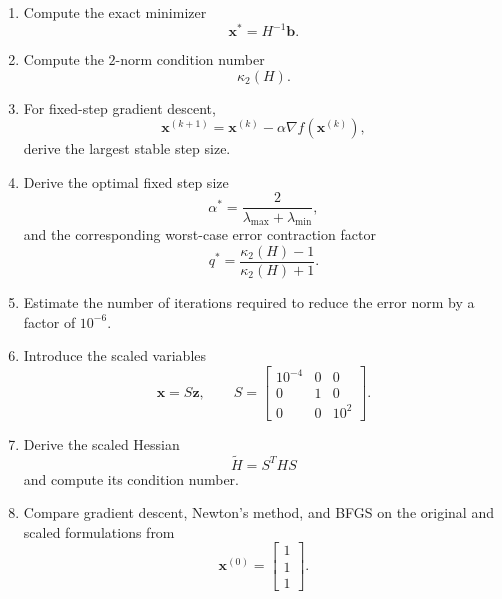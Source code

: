 \begin{enumerate}
    \item Compute the exact minimizer
    \begin{equation}
    \mathbf{x}^*=H^{-1}\mathbf{b}.
    \end{equation}

    \item Compute the $2$-norm condition number
    \begin{equation}
    \kappa_2(H).
    \end{equation}

    \item For fixed-step gradient descent,
    \begin{equation}
    \mathbf{x}^{(k+1)}
    =
    \mathbf{x}^{(k)}
    -
    \alpha
    \nabla f
    \left(
    \mathbf{x}^{(k)}
    \right),
    \end{equation}
    derive the largest stable step size.

    \item Derive the optimal fixed step size
    \begin{equation}
    \alpha^*
    =
    \frac{2}{\lambda_{\max}+\lambda_{\min}},
    \end{equation}
    and the corresponding worst-case error contraction factor
    \begin{equation}
    q^*
    =
    \frac{\kappa_2(H)-1}
    {\kappa_2(H)+1}.
    \end{equation}

    \item Estimate the number of iterations required to reduce the error norm
    by a factor of $10^{-6}$.

    \item Introduce the scaled variables
    \begin{equation}
    \mathbf{x}=S\mathbf{z},
    \qquad
    S=
    \begin{bmatrix}
    10^{-4}&0&0\\
    0&1&0\\
    0&0&10^2
    \end{bmatrix}.
    \end{equation}

    \item Derive the scaled Hessian
    \begin{equation}
    \widetilde{H}=S^THS
    \end{equation}
    and compute its condition number.

    \item Compare gradient descent, Newton's method, and BFGS on the original
    and scaled formulations from
    \begin{equation}
    \mathbf{x}^{(0)}=
    \begin{bmatrix}
    1\\1\\1
    \end{bmatrix}.
    \end{equation}


\end{enumerate}
